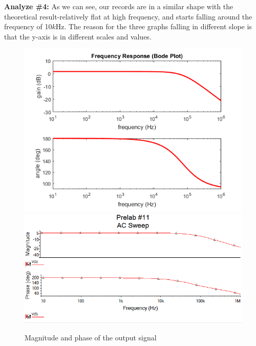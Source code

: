\textbf{Analyze \#4:} \newline
\phantom{ } As we can see, our records are in a similar shape with the theoretical result-relatively flat at high frequency, and starts falling around the frequency of 10$ \si{k\hertz} $. The reason for the three graphs falling in different slope is that the y-axis is in different scales and values.\\
\begin{figure}[!htbp]
	\centering 
	\begin{framed}
		\includegraphics[width=\linewidth]{prelab/images/9_1.PNG} 
		\includegraphics[width=\linewidth]{prelab/images/11_1.PNG}
		\caption{Magnitude and phase of the output signal}
		\label{fig:pre8} 
	\end{framed}
\end{figure} 

